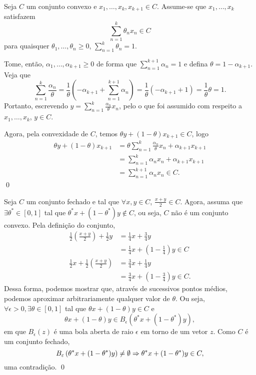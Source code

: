 \documentclass[a4paper]{report}
\begin{document}
Seja $C$ um conjunto convexo e $x_1,\ldots,x_k,x_{k+1}\in C$.
Assume-se que $x_1,\ldots,x_k$ satisfazem \[
\sum_{n=1}^{k} \theta_n x_n \in C
\] para quaisquer $\theta_1,\ldots,\theta_n\ge 0$, $\sum_{n=1}^{k} \theta_n=1$.

Tome, então, $\alpha_1,\ldots,\alpha_{k+1}\ge 0$ de forma que $\sum_{n=1}^{k+1} \alpha_n=1$ e defina $\theta=1-\alpha_{k+1}$.
Veja que \[
\sum_{n=1}^{k} \frac{\alpha_n}{\theta} = \frac{1}{\theta}\left( -\alpha_{k+1} + \sum_{n=1}^{k+1} \alpha_n \right) = \frac{1}{\theta}\left( -\alpha_{k+1} + 1 \right) = \frac{1}{\theta}\theta = 1
.\] 
Portanto, escrevendo  $y=\sum_{n=1}^{k} \frac{\alpha_n}{\theta}x_n$, pelo o que foi assumido com respeito a $x_1,\ldots,x_k$, $y\in C$.

Agora, pela convexidade de $C$, temos $\theta y + \left( 1-\theta \right)x_{k+1} \in C$, logo
\begin{align*}
    \theta y + \left( 1-\theta \right)x_{k+1} &= \theta \sum_{n=1}^{k} \frac{\alpha_n}{\theta}x_n + \alpha_{k+1}x_{k+1}  \\
    &= \sum_{n=1}^{k} \alpha_n x_n + \alpha_{k+1}x_{k+1}  \\
    &= \sum_{n=1}^{k+1} \alpha_n x_n \in C
.\end{align*}
\qed


Seja $C$ um conjunto fechado e tal que $\forall x,y \in C$, $\frac{x+y}{2}\in C$.
Agora, assuma que $\exists \theta^{*}\in \left[ 0,1 \right] $ tal que $\theta^{*} x + (1-\theta^{*})y \not\in C$, ou seja, $C$ não é um conjunto convexo.
Pela definição do conjunto, 
\begin{align*}
    \frac{1}{2}\left( \frac{x+y}{2} \right) + \frac{1}{2}y &= \frac{1}{4}x + \frac{3}{4}y \\
    &= \frac{1}{4}x + \left( 1-\frac{1}{4} \right)y \in C \\
    \frac{1}{2}x + \frac{1}{2}\left( \frac{x+y}{2} \right) &= \frac{3}{4}x + \frac{1}{4}y \\
    &= \frac{3}{4}x + \left( 1-\frac{3}{4} \right)y \in C 
.\end{align*}
Dessa forma, podemos mostrar que, através de sucessivos pontos médios, podemos aproximar arbitrariamente qualquer valor de $\theta$. 
Ou seja, $\forall \epsilon > 0, \exists \theta\in \left[ 0,1 \right]$ tal que $\theta x + (1-\theta)y \in  C$ e \[
\theta x + (1-\theta)y \in B_\epsilon\left( \theta^{*}x + (1-\theta^{*})y \right) 
,\] em que $B_\epsilon(z)$ é uma bola aberta de raio  $\epsilon$ em torno de um vetor $z$.
Como $C$ é um conjunto fechado, \[
B_\varepsilon\left( \theta^{*}x + (1-\theta^{*})y \right) \neq \emptyset \Rightarrow \theta^{*}x + (1-\theta^{*})y \in C
,\] uma contradição.
\qed
\end{document}
